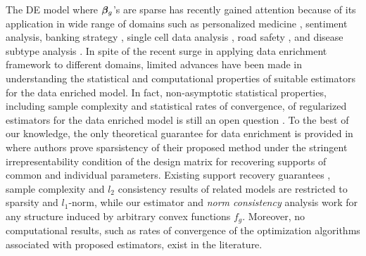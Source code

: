 The DE model where $\boldsymbol{\beta}_g$'s are sparse has recently gained attention because of its application in wide range of domains such as personalized medicine \cite{domu16}, sentiment analysis, banking strategy \cite{grti16}, single cell data analysis \cite{olvi15}, road safety \cite{olvi14}, and disease subtype analysis \cite{domu16}.
In spite of the recent surge in applying data enrichment framework to different domains, limited advances have been made in
understanding the statistical and computational properties of suitable estimators for the data enriched model.
In fact, non-asymptotic statistical properties, including sample complexity and statistical rates of convergence, of regularized estimators for the data enriched model is still an open question \cite{grti16, olvi14}.
To the best of our knowledge, the only theoretical guarantee for data enrichment is provided in \cite{olvi15} where authors prove sparsistency of their proposed method under the stringent irrepresentability condition of the design matrix for recovering supports of common and individual parameters.
Existing support recovery guarantees \cite{olvi15}, sample complexity and $l_2$ consistency results \cite{jrsr10} of related models are restricted to sparsity and $l_1$-norm, while our estimator and \emph{norm consistency} analysis work for any structure induced by arbitrary convex functions $f_g$. 
Moreover, no computational results, such as rates of convergence of the optimization algorithms associated with proposed estimators, exist in the literature.

